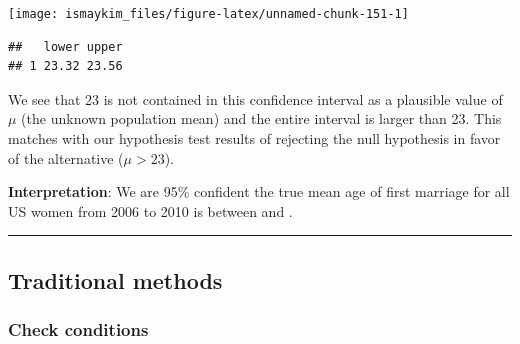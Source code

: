 \documentclass[]{tufte-book}
\newenvironment{Shaded}{\begin{snugshade}}{\end{snugshade}}
\newcommand{\KeywordTok}[1]{\textcolor[rgb]{0.13,0.29,0.53}{\textbf{{#1}}}}
\newcommand{\DataTypeTok}[1]{\textcolor[rgb]{0.13,0.29,0.53}{{#1}}}
\newcommand{\DecValTok}[1]{\textcolor[rgb]{0.00,0.00,0.81}{{#1}}}
\newcommand{\FloatTok}[1]{\textcolor[rgb]{0.00,0.00,0.81}{{#1}}}
\newcommand{\StringTok}[1]{\textcolor[rgb]{0.31,0.60,0.02}{{#1}}}
\newcommand{\NormalTok}[1]{{#1}}
\let\oldrule=\rule
\renewcommand{\rule}[1]{\oldrule{\linewidth}}
\begin{document}
\begin{Shaded}
\end{Shaded}

\begin{center}\texttt{[image: ismaykim\_files/figure-latex/unnamed-chunk-151-1]} \end{center}

\begin{Shaded}
\end{Shaded}

\begin{verbatim}
##   lower upper
## 1 23.32 23.56
\end{verbatim}

We see that 23 is not contained in this confidence interval as a
plausible value of \(\mu\) (the unknown population mean) and the entire
interval is larger than 23. This matches with our hypothesis test
results of rejecting the null hypothesis in favor of the alternative
(\(\mu > 23\)).

\textbf{Interpretation}: We are 95\% confident the true mean age of
first marriage for all US women from 2006 to 2010 is between and .

\begin{center}\rule{0.5\linewidth}{\linethickness}\end{center}

\subsection{Traditional methods}\label{traditional-methods}

\subsubsection{Check conditions}\label{check-conditions}
\end{document}
